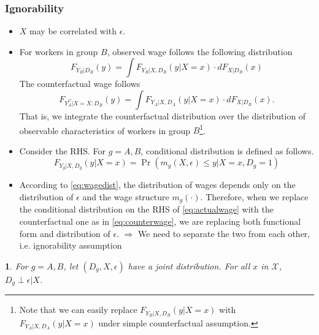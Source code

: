 \documentclass[a4paper, 12pt]{article}
\makeatletter
\newtheorem*{assumption*}{\assumptionnumber}
\providecommand{\assumptionnumber}{}
\newenvironment{assumption}[2]
 {%
  \renewcommand{\assumptionnumber}{Assumption #1 \textit{(#2)}}%
  \begin{assumption*}%
  \protected@edef\@currentlabel{#1}%
 }
 {%
  \end{assumption*}
 }
\makeatother
\begin{document}
\subsubsection{Ignorability}
\begin{itemize}
\item $X$ may be correlated with $\epsilon$. 
\item For workers in group $B$, observed wage follows the following distribution
\begin{equation}
F_{Y_B|D_B}(y) = \int F_{Y_B|X,D_B}(y|X=x) \cdot dF_{X|D_B}(x)
\label{eq:actualwage}
\end{equation}
The counterfactual wage follows
\begin{equation}
F_{Y^C_A|X=X:D_B}(y) = \int F_{Y_A|X,D_A}(y|X=x) \cdot dF_{X|D_B}(x).
\label{eq:counterwage}
\end{equation}
That is, we integrate the counterfactual distribution over the distribution of observable characteristics of workers in group $B$\footnote{Note that we can easily replace $F_{Y_B|X,D_B}(y|X=x)$ with $F_{Y_A|X,D_A}(y|X=x)$ under simple counterfactual assumption.}.

\item Consider the RHS. For $g=A, B$, conditional distribution is defined as follows.
\begin{equation}
F_{Y_g|X,D_g}(y|X=x) = 
\Pr
(
m_g(X,\epsilon)
\leq
y
|
X=x, D_g=1
)
\label{eq:wagedist}
\end{equation}

\item According to \eqref{eq:wagedist}, the distribution of wages depends only on the distribution of $\epsilon$ and the wage structure $m_g(\cdot)$. Therefore, when we replace the conditional distribution on the RHS of \eqref{eq:actualwage} with the counterfactual one as in \eqref{eq:counterwage}, we are replacing both functional form and distribution of $\epsilon$. $\Rightarrow$ We need to separate the two from each other, i.e. ignorability assumption

\end{itemize}

\begin{assumption}{5}{Ignorability/Conditional independence}
For $g=A, B$, let $(D_g, X, \epsilon)$ have a joint distribution. For all $x$ in $\mathcal{X}$, $D_g \perp \epsilon|X$. 
\end{assumption}
\end{document}

